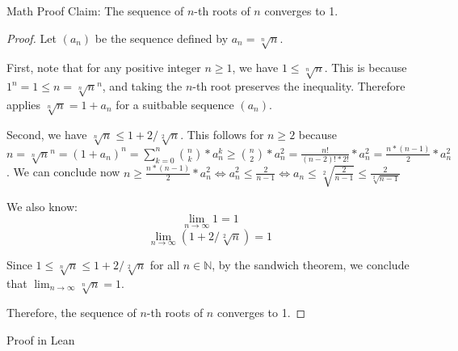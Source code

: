 \documentclass{beamer}
\begin{document}
\begin{frame}{Math Proof}
    Claim: The sequence of $n$-th roots of $n$ converges to 1.
    \begin{proof}
        Let $(a_n)$ be the sequence defined by $a_n = \sqrt[n]{n}$.

        First, note that for any positive integer $n \geq 1$, we have $1 \leq \sqrt[n]{n}$. This is because $1^n = 1 \leq n = \sqrt[n]{n}^n$, and taking the $n$-th root preserves the inequality. Therefore applies $\sqrt[n]{n} = 1 + a_n$ for a suitbable sequence $(a_n)$.

        Second, we have $ \sqrt[n]{n} \leq 1 + 2 / \sqrt[2]{n}$. This follows for $n \geq 2$ because $n = \sqrt[n]{n}^n = (1 + a_n)^n = \sum_{k=0}^{n} \binom{n}{k} * a_n ^k \geq \binom{n}{2} * a_n^2 = \frac{n!}{(n-2)! * 2!} * a_n^2 =\frac{n * (n-1)}{2} * a_n^2$ . 
        We can conclude now $n \geq \frac{n * (n-1)}{2} * a_n^2
        \Leftrightarrow a_n^2 \leq \frac{2}{n-1} \Leftrightarrow a_n \leq \sqrt[2]{\frac{2}{n-1}} \leq \frac{2}{\sqrt[2]{n-1}}$

       We also know:
        \[
        \lim_{n \to \infty} 1 = 1
        \]
        \[
        \lim_{n \to \infty} (1 + 2 / \sqrt[2]{n}) = 1
        \]

        Since $1 \leq \sqrt[n]{n} \leq 1 + 2 / \sqrt[2]{n}$ for all $n \in \mathbb{N}$, by the sandwich theorem, we conclude that $\lim_{n \to \infty} \sqrt[n]{n} = 1$.

        Therefore, the sequence of $n$-th roots of $n$ converges to 1.
    \end{proof}

\end{frame} 

\begin{frame}{Proof in Lean}
\end{frame}
\end{document}
